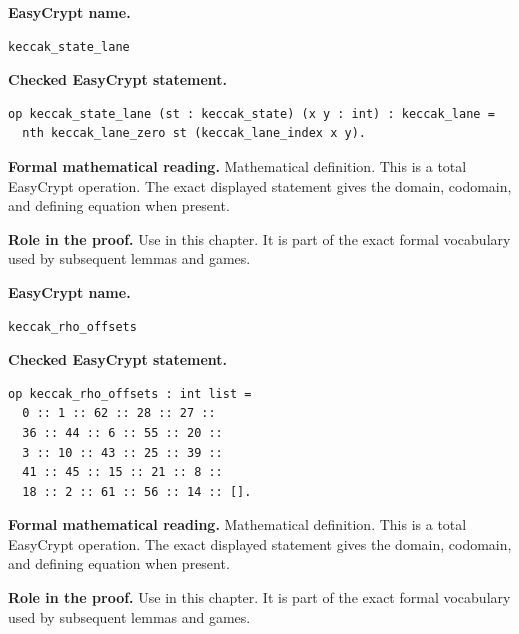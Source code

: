 \begin{formaldefinition}
\noindent\textbf{EasyCrypt name.}
\begin{lstlisting}[language=EasyCrypt,basicstyle=\ttfamily\scriptsize]
keccak_state_lane
\end{lstlisting}
\noindent\textbf{Checked EasyCrypt statement.}
\begin{lstlisting}[language=EasyCrypt,basicstyle=\ttfamily\scriptsize]
op keccak_state_lane (st : keccak_state) (x y : int) : keccak_lane =
  nth keccak_lane_zero st (keccak_lane_index x y).
\end{lstlisting}
\noindent\textbf{Formal mathematical reading.}
Mathematical definition. This is a total EasyCrypt operation.  The exact displayed statement gives the domain, codomain, and defining equation when present.

\noindent\textbf{Role in the proof.}
Use in this chapter. It is part of the exact formal vocabulary used by subsequent lemmas and games.

\end{formaldefinition}

\begin{formaldefinition}
\noindent\textbf{EasyCrypt name.}
\begin{lstlisting}[language=EasyCrypt,basicstyle=\ttfamily\scriptsize]
keccak_rho_offsets
\end{lstlisting}
\noindent\textbf{Checked EasyCrypt statement.}
\begin{lstlisting}[language=EasyCrypt,basicstyle=\ttfamily\scriptsize]
op keccak_rho_offsets : int list =
  0 :: 1 :: 62 :: 28 :: 27 ::
  36 :: 44 :: 6 :: 55 :: 20 ::
  3 :: 10 :: 43 :: 25 :: 39 ::
  41 :: 45 :: 15 :: 21 :: 8 ::
  18 :: 2 :: 61 :: 56 :: 14 :: [].
\end{lstlisting}
\noindent\textbf{Formal mathematical reading.}
Mathematical definition. This is a total EasyCrypt operation.  The exact displayed statement gives the domain, codomain, and defining equation when present.

\noindent\textbf{Role in the proof.}
Use in this chapter. It is part of the exact formal vocabulary used by subsequent lemmas and games.

\end{formaldefinition}

